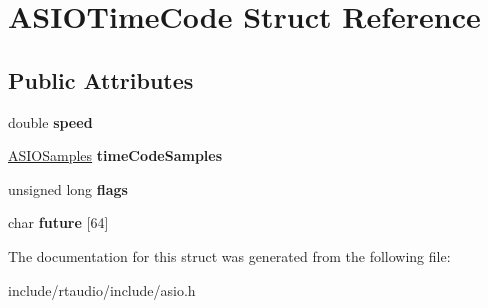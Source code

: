 \hypertarget{struct_a_s_i_o_time_code}{}\section{A\+S\+I\+O\+Time\+Code Struct Reference}
\label{struct_a_s_i_o_time_code}
\subsection*{Public Attributes}
\begin{DoxyCompactItemize}
\item 
double {\bfseries speed}\hypertarget{struct_a_s_i_o_time_code_ac0e76447f0df9cb3fa257becc33bd592}{}\label{struct_a_s_i_o_time_code_ac0e76447f0df9cb3fa257becc33bd592}

\item 
\hyperlink{struct_a_s_i_o_samples}{A\+S\+I\+O\+Samples} {\bfseries time\+Code\+Samples}\hypertarget{struct_a_s_i_o_time_code_a1472fffa91ccef74f3d36ac6d5e35a13}{}\label{struct_a_s_i_o_time_code_a1472fffa91ccef74f3d36ac6d5e35a13}

\item 
unsigned long {\bfseries flags}\hypertarget{struct_a_s_i_o_time_code_a366f7fa2c0c728974964c73f00c1a80a}{}\label{struct_a_s_i_o_time_code_a366f7fa2c0c728974964c73f00c1a80a}

\item 
char {\bfseries future} \mbox{[}64\mbox{]}\hypertarget{struct_a_s_i_o_time_code_a17937f9f050393eb500202b1ab16babf}{}\label{struct_a_s_i_o_time_code_a17937f9f050393eb500202b1ab16babf}

\end{DoxyCompactItemize}


The documentation for this struct was generated from the following file\+:\begin{DoxyCompactItemize}
\item 
include/rtaudio/include/asio.\+h\end{DoxyCompactItemize}
